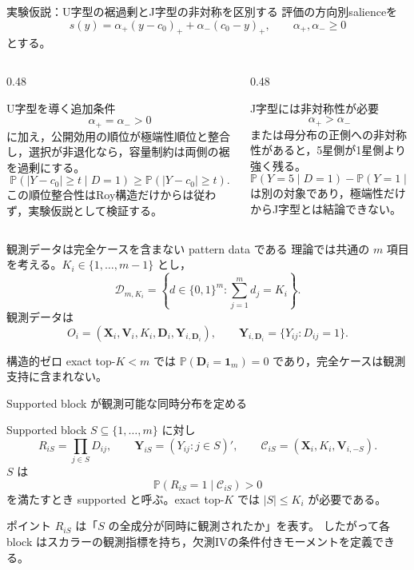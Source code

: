 \documentclass[aspectratio=169,10pt]{beamer}
\newcommand{\Prb}{\mathbb{P}}
\newcommand{\1}{\mathbf{1}}
\newcommand{\Y}{\bm{Y}}
\newcommand{\V}{\bm{V}}
\newcommand{\X}{\bm{X}}
\newcommand{\D}{\bm{D}}
\begin{document}
\begin{frame}[shrink=7]{実験仮説：U字型の裾過剰とJ字型の非対称を区別する}
評価の方向別salienceを
\[
s(y)=\alpha_+(y-c_0)_++\alpha_-(c_0-y)_+,
\qquad \alpha_+,\alpha_-\ge0
\]
とする。
\begin{columns}[T,onlytextwidth]
\begin{column}{0.48\textwidth}
\begin{block}{U字型を導く追加条件}
\[
\alpha_+=\alpha_->0
\]
に加え，公開効用の順位が極端性順位と整合し，選択が非退化なら，容量制約は両側の裾を過剰にする。
\[
\Prb(|Y-c_0|\ge t\mid D=1)
\ge
\Prb(|Y-c_0|\ge t).
\]
この順位整合性はRoy構造だけからは従わず，実験仮説として検証する。
\end{block}
\end{column}
\begin{column}{0.48\textwidth}
\begin{alertblock}{J字型には非対称性が必要}
\[
\alpha_+>\alpha_-
\]
または母分布の正側への非対称性があると，5星側が1星側より強く残る。
\[
\Prb(Y=5\mid D=1)-\Prb(Y=1\mid D=1)
\]
は別の対象であり，極端性だけからJ字型とは結論できない。
\end{alertblock}
\end{column}
\end{columns}
\end{frame}

\begin{frame}{観測データは完全ケースを含まない pattern data である}
理論では共通の $m$ 項目を考える。$K_i\in\{1,\ldots,m-1\}$ とし，
\[
\mathcal D_{m,K_i}
=\left\{d\in\{0,1\}^m:\sum_{j=1}^m d_j=K_i\right\}.
\]
観測データは
\[
O_i=\left(\X_i,\V_i,K_i,\D_i,\Y_{i,\D_i}\right),
\qquad
\Y_{i,\D_i}=\{Y_{ij}:D_{ij}=1\}.
\tag{O}
\]
\begin{alertblock}{構造的ゼロ}
exact top-$K<m$ では $\Prb(\D_i=\bm1_m)=0$ であり，完全ケースは観測支持に含まれない。
\end{alertblock}
\end{frame}

\begin{frame}{Supported block が観測可能な同時分布を定める}
\begin{block}{Supported block}
$S\subseteq\{1,\ldots,m\}$ に対し
\[
R_{iS}=\prod_{j\in S}D_{ij},
\qquad
\Y_{iS}=(Y_{ij}:j\in S)',
\qquad
\mathcal C_{iS}=(\X_i,K_i,\V_{i,-S}).
\]
$S$ は
\[
\Prb(R_{iS}=1\mid\mathcal C_{iS})>0
\]
を満たすとき supported と呼ぶ。exact top-$K$ では $|S|\le K_i$ が必要である。
\end{block}
\begin{alertblock}{ポイント}
$R_{iS}$ は「$S$ の全成分が同時に観測されたか」を表す。
したがって各 block はスカラーの観測指標を持ち，欠測IVの条件付きモーメントを定義できる。
\end{alertblock}
\end{frame}
\end{document}
